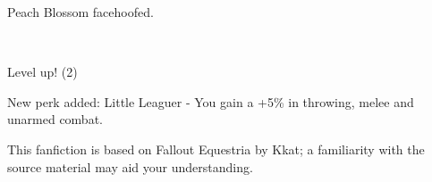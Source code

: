 Peach Blossom facehoofed.

\clearpage

~\vfill

\begin{engnote}
Level up! (2)

New perk added: Little Leaguer - You gain a +5\% in throwing, melee and unarmed combat.

This fanfiction is based on Fallout Equestria by Kkat; a familiarity with the source material may aid your understanding.
\end{engnote}



